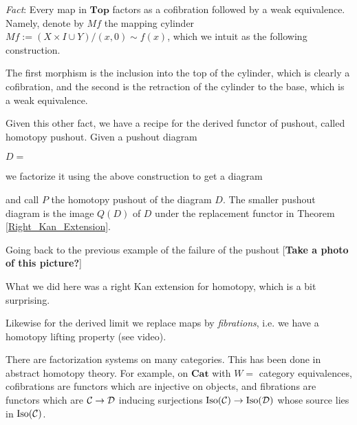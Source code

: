 \documentclass[class=report, crop=false,a4paper,twoside]{standalone}
\begin{document}
\emph{Fact}: Every map in $\mathbf{Top}$ factors as a cofibration followed by a weak equivalence. Namely, denote by $Mf$ the mapping cylinder $Mf := (X \times I \cup Y)/(x,0) \sim f(x)$, which we intuit as the following construction.

\begin{figure}[h]
\end{figure}

The first morphism is the inclusion into the top of the cylinder, which is clearly a cofibration, and the second is the retraction of the cylinder to the base, which is a weak equivalence.

Given this other fact, we have a recipe for the derived functor of pushout, called homotopy pushout. Given a pushout diagram
\begin{center}
$D=$
\end{center}
we factorize it using the above construction to get a diagram
\begin{center}
\end{center}
and call $P$ the homotopy pushout of the diagram $D$. The smaller pushout diagram is the image $Q(D)$ of $D$ under the replacement functor in Theorem \ref{Right_Kan_Extension}. 

Going back to the previous example of the failure of the pushout [\textbf{Take a photo of this picture?}]

What we did here was a right Kan extension for homotopy, which is a bit surprising.

Likewise for the derived limit we replace maps by \emph{fibrations}, i.e. we have a homotopy lifting property (see video).

There are factorization systems on many categories. This has been done in abstract homotopy theory. For example, on $\mathbf{Cat}$ with $W =$ category equivalences, cofibrations are functors which are injective on objects, and fibrations are functors which are $\mathcal{C} \to \mathcal{D}$ inducing surjections $\operatorname{Iso}(\mathcal{C}) \to \operatorname{Iso}(\mathcal{D})$ whose source lies in $\operatorname{Iso}(\mathcal{C})$. 
\end{document}
